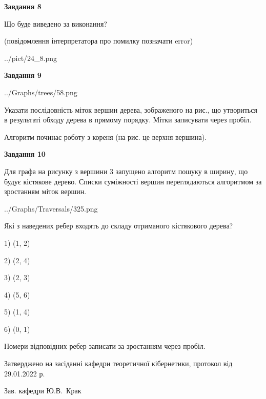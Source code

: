 \documentclass[12pt, ukrainian]{article}
\begin{document}
{\begin {large}
{\begin {center}\textbf{Завдання 8}\end {center}}\par
Що буде виведено за виконання?\par
 (повідомлення інтерпретатора про помилку позначати error)\par
\begin{center}
	{../pict/24_8.png}
\end{center}
\newpage

{\begin {center}\textbf{Завдання 9}\end {center}}\par

\begin{center}
	{../Graphs/trees/58.png}
\end{center}
Указати послідовність міток вершин дерева, зображеного на рис., що утвориться в результаті обходу дерева в прямому порядку. Мітки записувати через пробіл.\par Алгоритм починає роботу з кореня (на рис. це верхня вершина).\par
\newpage

{\begin {center}\textbf{Завдання 10}\end {center}}\par
Для графа на рисунку з вершини 3 запущено алгоритм пошуку в ширину, що будує кістякове дерево. Списки суміжності вершин переглядаються алгоритмом за зростанням міток вершин.\par
\begin{center}
	{../Graphs/Traversals/325.png}
\end{center}
\par Які з наведених ребер входять до складу отриманого кістякового дерева?\par
1) (1, 2)\par
2) (2, 4)\par
3) (2, 3)\par
4) (5, 6)\par
5) (1, 4)\par
6) (0, 1)\par
{\vskip 15pt} Номери відповідних ребер записати за зростанням через пробіл.\par
\newpage


\end {large}
}
{\smallskip \begin {small} Затверджено на засіданні кафедри теоретичної кібернетики, протокол  від   29.01.2022 р.\par\smallskip\smallskip
{\parbox {6.5 cm}{Зав. кафедри \dotfill Ю.В.~Крак}} \end{small}}
\end{document}
